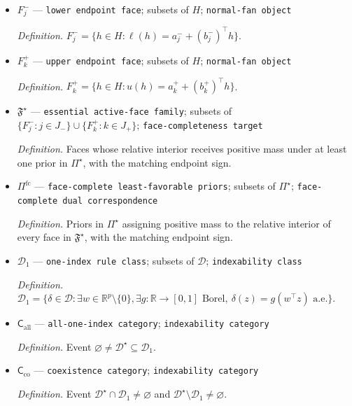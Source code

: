 \documentclass{article}
\begin{document}
\begin{itemize}
  \par\smallskip\noindent\emph{Definition.} \(\Pi^{\star}=\{\pi\in\Pi:b(\pi)=v\}\).
  \item \(F_j^{-}\) --- \texttt{lower endpoint face}; subsets of \(H\); \texttt{normal-\allowbreak{}fan object}
  \par\smallskip\noindent\emph{Definition.} \(F_j^{-}=\{h\in H:\ell(h)=a_j^{-}+(b_j^{-})^{\top}h\}\).
  \item \(F_k^{+}\) --- \texttt{upper endpoint face}; subsets of \(H\); \texttt{normal-\allowbreak{}fan object}
  \par\smallskip\noindent\emph{Definition.} \(F_k^{+}=\{h\in H:u(h)=a_k^{+}+(b_k^{+})^{\top}h\}\).
  \item \(\mathfrak F^{\star}\) --- \texttt{essential active-\allowbreak{}face family}; subsets of \(\{F_j^{-}:j\in J_{-}\}\cup\{F_k^{+}:k\in J_{+}\}\); \texttt{face-\allowbreak{}completeness target}
  \par\smallskip\noindent\emph{Definition.} Faces whose relative interior receives positive mass under at least one prior in \(\Pi^{\star}\), with the matching endpoint sign.
  \item \(\Pi^{\mathrm{fc}}\) --- \texttt{face-\allowbreak{}complete least-\allowbreak{}favorable priors}; subsets of \(\Pi^{\star}\); \texttt{face-\allowbreak{}complete dual correspondence}
  \par\smallskip\noindent\emph{Definition.} Priors in \(\Pi^{\star}\) assigning positive mass to the relative interior of every face in \(\mathfrak F^{\star}\), with the matching endpoint sign.
  \item \(\mathcal D_{1}\) --- \texttt{one-\allowbreak{}index rule class}; subsets of \(\mathcal D\); \texttt{indexability class}
  \par\smallskip\noindent\emph{Definition.} \(\mathcal D_1=\{\delta\in\mathcal D:\exists w\in\mathbb R^p\setminus\{0\},\exists g:\mathbb R\to[0,1]\text{ Borel},\ \delta(z)=g(w^{\top}z)\text{ a.e.}\}\).
  \item \(\mathsf C_{\mathrm{all}}\) --- \texttt{all-\allowbreak{}one-\allowbreak{}index category}; \texttt{indexability category}
  \par\smallskip\noindent\emph{Definition.} Event \(\varnothing\ne\mathcal D^{\star}\subseteq\mathcal D_1\).
  \item \(\mathsf C_{\mathrm{co}}\) --- \texttt{coexistence category}; \texttt{indexability category}
  \par\smallskip\noindent\emph{Definition.} Event \(\mathcal D^{\star}\cap\mathcal D_1\ne\varnothing\) and \(\mathcal D^{\star}\setminus\mathcal D_1\ne\varnothing\).

\end{itemize}
\end{document}
